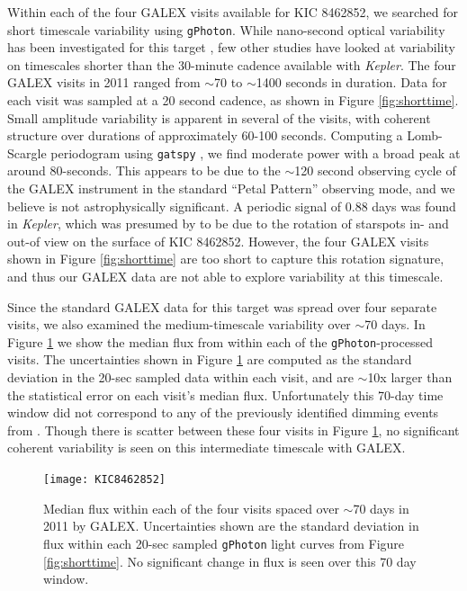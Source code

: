 \documentclass[twocolumn]{aastex6}
\newcommand{\Kepler}{\textsl{Kepler}\xspace}
\begin{document}
Within each of the four GALEX visits available for KIC 8462852, we searched for short timescale variability using {\tt gPhoton}. While nano-second optical variability has been investigated for this target \citep{abeysekara2016}, few other studies have looked at variability on timescales shorter than the 30-minute cadence available with \Kepler.
The four GALEX visits in 2011 ranged from $\sim$70 to $\sim$1400 seconds in duration. Data for each visit was sampled at a 20 second cadence, as shown in Figure \ref{fig:shorttime}. Small amplitude variability is apparent in several of the visits, with coherent structure over durations of approximately 60-100 seconds. Computing a Lomb-Scargle periodogram using {\tt gatspy} \citep{gatspy}, we find moderate power with a broad peak at around 80-seconds. This appears to be due to the $\sim$120 second observing cycle of the GALEX instrument in the standard ``Petal Pattern'' observing mode, and we believe is not astrophysically significant.
A periodic signal of 0.88 days was found in \Kepler, which was presumed by \citet{boyajian2015} to be due to the rotation of starspots in- and out-of view on the surface of KIC 8462852. However, the four GALEX visits shown in Figure \ref{fig:shorttime} are too short to capture this rotation signature, and thus our GALEX data are not able to explore variability at this timescale.




Since the standard GALEX data for this target was spread over four separate visits, we also examined the medium-timescale variability over $\sim$70 days. In Figure \ref{fig:medtime} we show the median flux from within each of the {\tt gPhoton}-processed visits. The uncertainties shown in Figure \ref{fig:medtime} are computed as the standard deviation in the 20-sec sampled data within each visit, and are $\sim$10x larger than the statistical error on each visit's median flux. Unfortunately this 70-day time window did not correspond to any of the previously identified dimming events from \citet{boyajian2015}. Though there is scatter between these four visits in Figure \ref{fig:medtime}, no significant coherent variability is seen on this intermediate timescale with GALEX.


\begin{figure}[!t]
\centering
\texttt{[image: KIC8462852]}
\caption{Median flux within each of the four visits spaced over $\sim$70 days in 2011 by GALEX. Uncertainties shown are the standard deviation in flux within each 20-sec sampled {\tt gPhoton} light curves from Figure \ref{fig:shorttime}. No significant change in flux is seen over this 70 day window.
}
\label{fig:medtime}
\end{figure}
\end{document}
